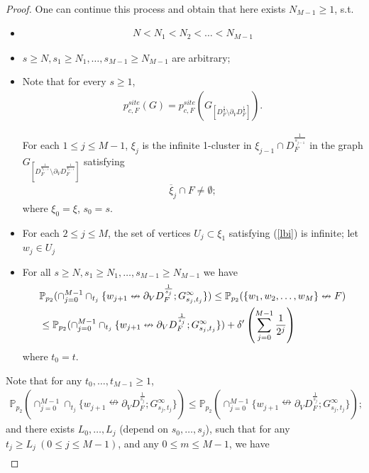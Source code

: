\documentclass[11pt]{amsart}
\theoremstyle{plain}
\numberwithin{equation}{section}
\numberwithin{figure}{section}
\newcommand\ol{\overline}
\newcommand\PP{{\mathbb P}}
\begin{document}
\begin{proof}
One can continue this process and obtain that here exists $N_{M-1}\geq 1$, s.t.
\begin{itemize}
\item \begin{align*}
N<N_1<N_2<\ldots< N_{M-1}
\end{align*}
\item $s\geq N,s_1\geq N_1,\ldots,s_{M-1}\geq N_{M-1}$ are arbitrary;
\item Note that for every $s\geq 1$,
\begin{align*}
p_{c,F}^{site}(G)=p_{c,F}^{site}\left(G_{\left[D_{F}^{\frac{1}{s}}\setminus \partial_V D_{F}^{\frac{1}{s}} \right]}\right).
\end{align*}

For each $1\leq j\leq M-1$, $\xi_j$ is the infinite 1-cluster in $\xi_{j-1}\cap D_F^{\frac{1}{s_{j-1}}}$ in the graph $G_{\left[D_{F}^{\frac{1}{s_{j-1}}}\setminus \partial_V D_{F}^{\frac{1}{s_{j-1}}} \right]}$ satisfying
\begin{align*}
\ol{\xi}_j\cap F\neq\emptyset;
\end{align*}    
where $\xi_0=\xi$, $s_0=s$.
\item For each $2\leq j\leq M$, the set of vertices $U_j\subset \xi_1$ satisfying (\ref{lbi}) is infinite; let $w_j\in U_j$
\item For all $s\geq N,s_1\geq N_1,\ldots,s_{M-1}\geq N_{M-1}$ we have
\begin{align}
\label{tc2}&\PP_{p_2}(\cap_{j=0}^{M-1}\cap_{t_j}\{w_{j+1}\nleftrightarrow \partial_V D_F^{\frac{1}{s_j}};G_{s_j,t_j}^{\infty}\})\leq \PP_{p_2}(\{w_1,w_2,\ldots,w_M\}\nleftrightarrow F)\\
&\leq \PP_{p_2}(\cap_{j=0}^{M-1}\cap_{t_j}\{w_{j+1}\nleftrightarrow \partial_V D_F^{\frac{1}{s_j}};G_{s_j,t_j}^{\infty}\})+\delta'\left(\sum_{j=0}^{M-1}\frac{1}{2^j}
\right)\notag
\end{align}
where $t_0=t$.
\end{itemize}
Note that for any $t_0,\ldots,t_{M-1}\geq 1$,
\begin{align*}
\PP_{p_2}(\cap_{j=0}^{M-1}\cap_{t_j}\{w_{j+1}\nleftrightarrow \partial_V D_F^{\frac{1}{s_j}};G_{s_j,t_j}^{\infty}\})
\leq \PP_{p_2}(\cap_{j=0}^{M-1}\{w_{j+1}\nleftrightarrow \partial_V D_F^{\frac{1}{s_j}};G_{s_j,t_j}^{\infty}\});
\end{align*}
and there exists $L_0,\ldots,L_j$ (depend on $s_0,\ldots,s_j$), such that for any $t_j\geq L_j\ (0\leq j\leq M-1)$, and any $0\le m\leq M-1$, we have
\begin{align}

\end{align}
\end{proof}
\end{document}
